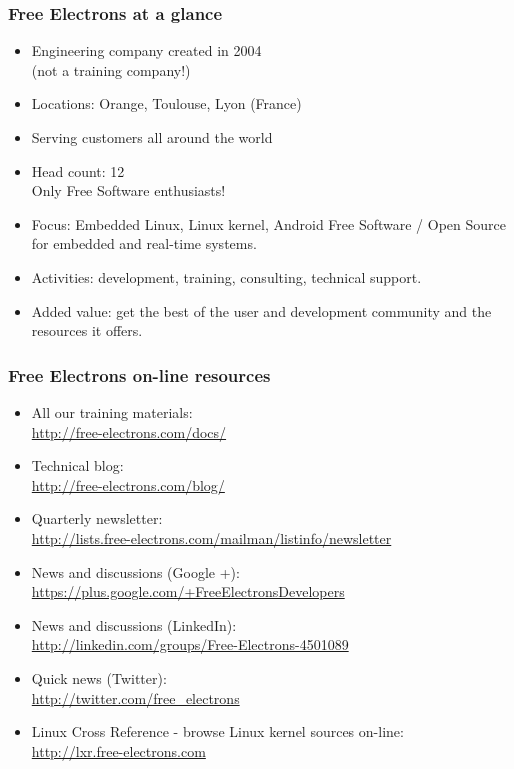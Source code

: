 \begin{frame}
\frametitle{Free Electrons at a glance}
  \begin{itemize}
    \item Engineering company created in 2004 \\
          (not a training company!)
    \item Locations: Orange, Toulouse, Lyon (France)
    \item Serving customers all around the world
    \item Head count: 12 \\
	  Only Free Software enthusiasts!
    \item Focus: Embedded Linux, Linux kernel, Android
          Free Software / Open Source
          for embedded and real-time systems.
    \item Activities: development, training, consulting, technical
          support.
    \item Added value: get the best of the user and development
          community and the resources it offers.
  \end{itemize}
\end{frame}

\begin{frame}
\frametitle{Free Electrons on-line resources}
  \begin{itemize}
    \item All our training materials:\\
          \url{http://free-electrons.com/docs/}
    \item Technical blog:\\
          \url{http://free-electrons.com/blog/}
    \item Quarterly newsletter:\\
 	  \url{http://lists.free-electrons.com/mailman/listinfo/newsletter}
    \item News and discussions (Google +):\\
	  \url{https://plus.google.com/+FreeElectronsDevelopers}
    \item News and discussions (LinkedIn):\\
	  \url{http://linkedin.com/groups/Free-Electrons-4501089}
    \item Quick news (Twitter):\\
          \url{http://twitter.com/free_electrons}
    \item Linux Cross Reference - browse Linux kernel sources on-line:\\
          \url{http://lxr.free-electrons.com}
  \end{itemize}
\end{frame}

